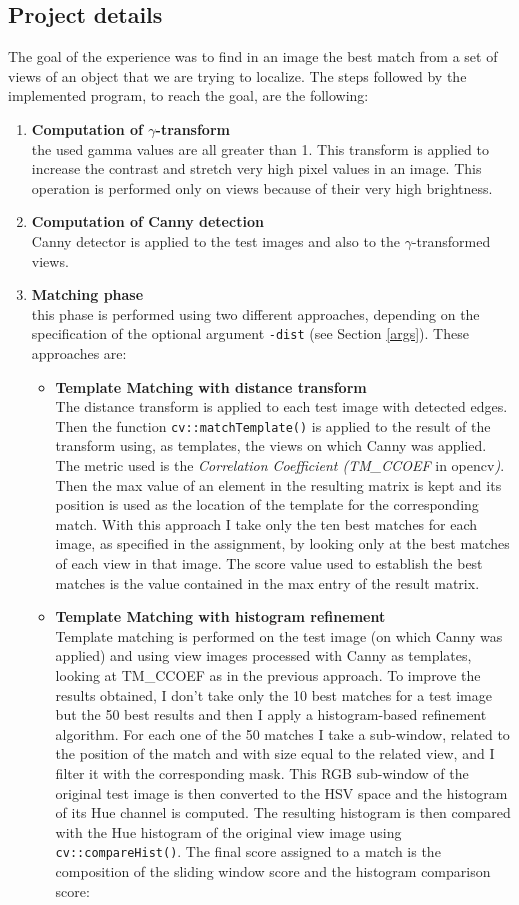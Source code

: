 \documentclass{article}
\begin{document}
\subsection{Project details}\label{details}
The goal of the experience was to find in an image the best match from a set of views of an object that we are trying to localize. The steps followed by the implemented program, to reach the goal, are the following:
\begin{enumerate}
\item{\textbf{Computation of $\gamma$-transform}\\
the used gamma values are all greater than 1. This transform is applied to increase the contrast and stretch very high pixel values in an image. This operation is performed only on views because of their very high brightness.}
\item{\textbf{Computation of Canny detection}\\
Canny detector is applied to the test images and also to the $\gamma$-transformed views.}
\item{\textbf{Matching phase}\\
this phase is performed using two different approaches, depending on the specification of the optional argument \texttt{-dist} (see Section \ref{args}). These approaches are:
\begin{itemize}
\item{\textbf{Template Matching with distance transform}\\
The distance transform is applied to each test image with detected edges. Then the function \texttt{cv::matchTemplate()} is applied to the result of the transform using, as templates, the views on which Canny was applied. The metric used is the \textit{Correlation Coefficient (TM\_CCOEF} in opencv\textit{)}. Then the max value of an element in the resulting matrix is kept and its position is used as the location of the template for the corresponding match. With this approach I take only the ten best matches for each image, as specified in the assignment, by looking only at the best matches of each view in that image. The score value used to establish the best matches is the value contained in the max entry of the result matrix.
}
\item{\textbf{Template Matching with histogram refinement}\\
Template matching is performed on the test image (on which Canny was applied) and using view images processed with Canny as templates, looking at TM\_CCOEF as in the previous approach. To improve the results obtained, I don't take only the 10 best matches for a test image but the 50 best results and then I apply a histogram-based refinement algorithm. For each one of the 50 matches I take a sub-window, related to the position of the match and with size equal to the related view, and I filter it with the corresponding mask. This RGB sub-window of the original test image is then converted to the HSV space and the histogram of its Hue channel is computed. The resulting histogram is then compared with the Hue histogram of the original view image using \texttt{cv::compareHist()}. The final score assigned to a match is the composition of the sliding window score and the histogram comparison score:
}
\end{itemize}}
\end{enumerate}
\end{document}

